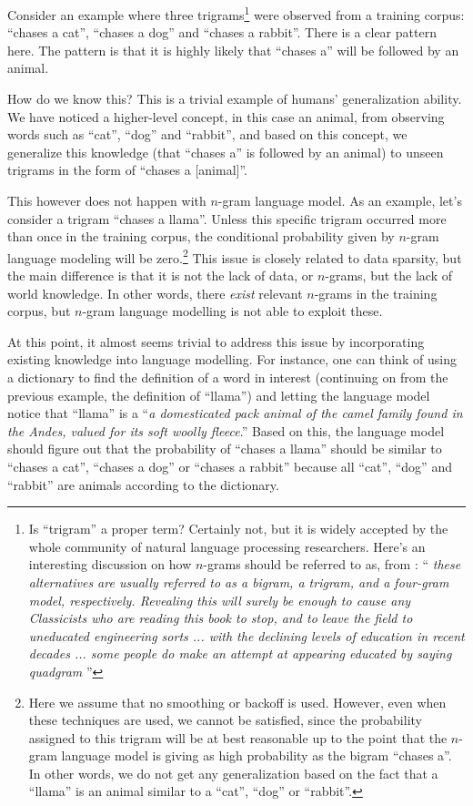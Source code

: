 \documentclass{report}
\begin{document}
Consider an example where three trigrams\footnote{
    Is ``trigram'' a proper term? Certainly not, but it is widely accepted by
    the whole community of natural language processing researchers. Here's an
    interesting discussion on how $n$-grams should be referred to as, from
    \citet{manning1999foundations}: ``\emph{
        these
        alternatives are usually referred to as a bigram, a trigram, and a
        four-gram model, respectively. Revealing this will surely be enough to
        cause any Classicists who are reading this book to stop, and to leave
        the field to uneducated engineering sorts ... with the declining levels
        of education in recent decades ... some people do make an attempt at
        appearing educated by saying quadgram
    }'' 
} were observed from a training corpus: ``chases a cat'', ``chases a dog'' and
``chases a rabbit''. There is a clear pattern here. The pattern is that it is
highly likely that ``chases a'' will be followed by an animal. 

How do we know this? This is a trivial example of humans' generalization
ability. We have noticed a higher-level concept, in this case an animal, from
observing words such as ``cat'', ``dog'' and ``rabbit'', and based on this
concept, we generalize this knowledge (that ``chases a'' is followed by an
animal) to unseen trigrams in the form of ``chases a [animal]''.

This however does not happen with $n$-gram language model. As an example, let's
consider a trigram ``chases a llama''. Unless this specific trigram occurred
more than once in the training corpus, the conditional probability given by 
$n$-gram language modeling will be zero.\footnote{
    Here we assume that no smoothing or backoff is used. However, even when
    these techniques are used, we cannot be satisfied, since the probability
    assigned to this trigram will be at best reasonable up to the point that the
    $n$-gram language model is giving as high probability as the bigram ``chases
    a''. In other words, we do not get any generalization based on the fact that
    a ``llama'' is an animal similar to a ``cat'', ``dog'' or ``rabbit''.
} This issue is closely related to data sparsity, but the main difference is
that it is not the lack of data, or $n$-grams, but the lack of world knowledge.
In other words, there {\em exist} relevant $n$-grams in the training corpus, but
$n$-gram language modelling is not able to exploit these.

At this point, it almost seems trivial to address this issue by incorporating
existing knowledge into language modelling. For instance, one can think of using
a dictionary to find the definition of a word in interest (continuing on from
the previous example, the definition of ``llama'') and letting the language
model notice that ``llama'' is a ``{\em a domesticated pack animal of the camel
family found in the Andes, valued for its soft woolly fleece}.'' Based on this,
the language model should figure out that the probability of ``chases a llama''
should be similar to ``chases a cat'', ``chases a dog'' or ``chases a rabbit''
because all ``cat'', ``dog'' and ``rabbit'' are animals according to the
dictionary.
\end{document}
